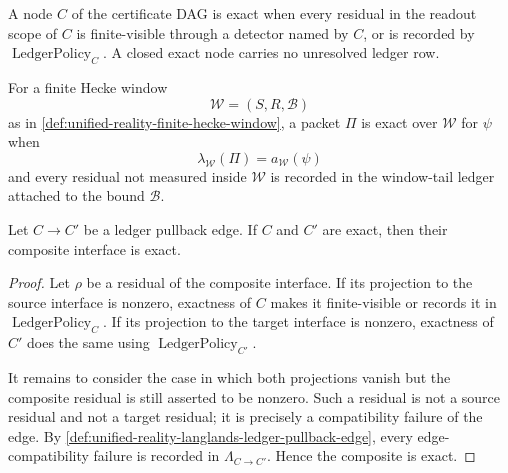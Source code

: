 \begin{definition}
\label{def:unified-reality-langlands-node-exactness}
A node $C$ of the certificate DAG is exact when every residual in the
readout scope of $C$ is finite-visible through a detector named by
$C$, or is recorded by $\operatorname{LedgerPolicy}_C$. A closed exact
node carries no unresolved ledger row.
\end{definition}

\begin{definition}
\label{def:unified-reality-langlands-finite-window-exactness}
For a finite Hecke window
$$
\mathcal W=(S,R,\mathcal B)
$$
as in \autoref{def:unified-reality-finite-hecke-window}, a packet
$\Pi$ is exact over $\mathcal W$ for $\psi$ when
$$
\lambda_{\mathcal W}(\Pi)
=
a_{\mathcal W}(\psi)
$$
and every residual not measured inside $\mathcal W$ is recorded in the
window-tail ledger attached to the bound $\mathcal B$.
\end{definition}

\begin{theorem}
\label{thm:unified-reality-ledger-pullback-preserves-exactness}
Let $C\to C'$ be a ledger pullback edge. If $C$ and $C'$ are exact, then
their composite interface is exact.
\end{theorem}
\begin{proof}
Let $\rho$ be a residual of the composite interface. If its projection
to the source interface is nonzero, exactness of $C$ makes it
finite-visible or records it in $\operatorname{LedgerPolicy}_C$. If its
projection to the target interface is nonzero, exactness of $C'$ does
the same using $\operatorname{LedgerPolicy}_{C'}$.

It remains to consider the case in which both projections vanish but
the composite residual is still asserted to be nonzero. Such a residual
is not a source residual and not a target residual; it is precisely a
compatibility failure of the edge. By
\autoref{def:unified-reality-langlands-ledger-pullback-edge}, every
edge-compatibility failure is recorded in $\Lambda_{C\to C'}$. Hence
the composite is exact.
\end{proof}

